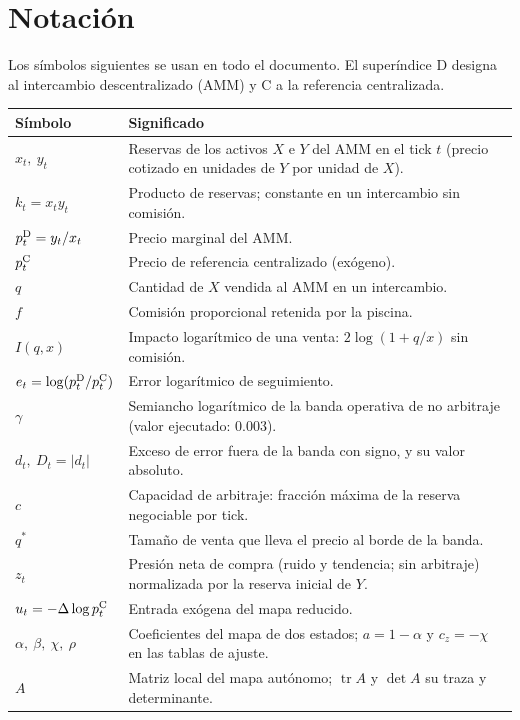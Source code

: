 \chapter*{Notación}

Los símbolos siguientes se usan en todo el documento. El superíndice $\mathrm{D}$ designa al intercambio descentralizado (AMM) y $\mathrm{C}$ a la referencia centralizada.

\begin{center}
\small
\begin{tabularx}{\textwidth}{@{}l X@{}}
\toprule
Símbolo & Significado \\
\midrule
$x_t,\ y_t$ & Reservas de los activos $X$ e $Y$ del AMM en el tick $t$ (precio cotizado en unidades de $Y$ por unidad de $X$). \\
$k_t = x_t y_t$ & Producto de reservas; constante en un intercambio sin comisión. \\
$p^{\mathrm{D}}_t = y_t/x_t$ & Precio marginal del AMM. \\
$p^{\mathrm{C}}_t$ & Precio de referencia centralizado (exógeno). \\
$q$ & Cantidad de $X$ vendida al AMM en un intercambio. \\
$f$ & Comisión proporcional retenida por la piscina. \\
$I(q,x)$ & Impacto logarítmico de una venta: $2\log(1+q/x)$ sin comisión. \\
$e_t = \log(p^{\mathrm{D}}_t/p^{\mathrm{C}}_t)$ & Error logarítmico de seguimiento. \\
$\gamma$ & Semiancho logarítmico de la banda operativa de no arbitraje (valor ejecutado: $0.003$). \\
$d_t,\ D_t = |d_t|$ & Exceso de error fuera de la banda con signo, y su valor absoluto. \\
$c$ & Capacidad de arbitraje: fracción máxima de la reserva negociable por tick. \\
$q^{\ast}$ & Tamaño de venta que lleva el precio al borde de la banda. \\
$z_t$ & Presión neta de compra (ruido y tendencia; sin arbitraje) normalizada por la reserva inicial de $Y$. \\
$u_t = -\Delta\log p^{\mathrm{C}}_t$ & Entrada exógena del mapa reducido. \\
$\alpha,\ \beta,\ \chi,\ \rho$ & Coeficientes del mapa de dos estados; $a = 1-\alpha$ y $c_z = -\chi$ en las tablas de ajuste. \\
$A$ & Matriz local del mapa autónomo; $\operatorname{tr}A$ y $\det A$ su traza y determinante. \\

\end{tabularx}
\end{center}
